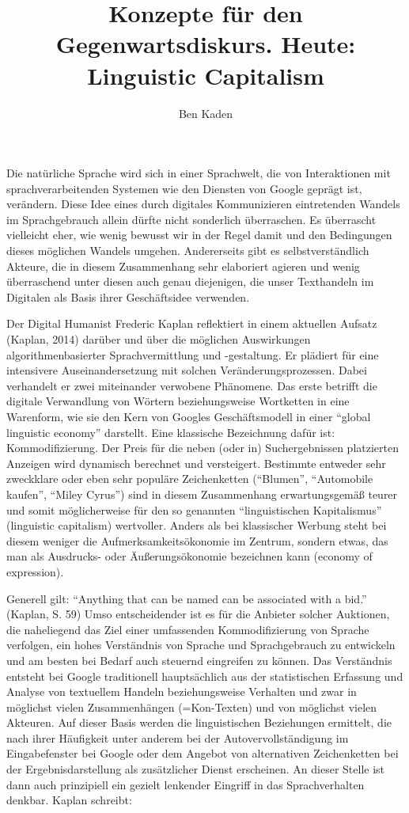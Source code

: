 \documentclass[a4paper,
fontsize=11pt,
oneside,
numbers=noperiodatend,
parskip=half-,
bibliography=totoc,
final
]{scrartcl}
\title{\LARGE{Konzepte für den Gegenwartsdiskurs. Heute: Linguistic Capitalism}} %
\author{Ben Kaden} %
\date{}
\begin{document}
\maketitle
\thispagestyle{fancyplain} 


Die natürliche Sprache wird sich in einer Sprachwelt, die von
Interaktionen mit sprachverarbeitenden Systemen wie den Diensten von
Google geprägt ist, verändern. Diese Idee eines durch digitales
Kommunizieren eintretenden Wandels im Sprachgebrauch allein dürfte nicht
sonderlich überraschen. Es überrascht vielleicht eher, wie wenig bewusst
wir in der Regel damit und den Bedingungen dieses möglichen Wandels
umgehen. Andererseits gibt es selbstverständlich Akteure, die in diesem
Zusammenhang sehr elaboriert agieren und wenig überraschend unter diesen
auch genau diejenigen, die unser Texthandeln im Digitalen als Basis
ihrer Geschäftsidee verwenden.

Der Digital Humanist Frederic Kaplan reflektiert in einem aktuellen
Aufsatz (Kaplan, 2014) darüber und über die möglichen Auswirkungen
algorithmenbasierter Sprachvermittlung und -gestaltung. Er plädiert für
eine intensivere Auseinandersetzung mit solchen Veränderungsprozessen.
Dabei verhandelt er zwei miteinander verwobene Phänomene. Das erste
betrifft die digitale Verwandlung von Wörtern beziehungsweise Wortketten
in eine Warenform, wie sie den Kern von Googles Geschäftsmodell in einer
\enquote{global linguistic economy} darstellt. Eine klassische
Bezeichnung dafür ist: Kommodifizierung. Der Preis für die neben (oder
in) Suchergebnissen platzierten Anzeigen wird dynamisch berechnet und
versteigert. Bestimmte entweder sehr zweckklare oder eben sehr populäre
Zeichenketten (\enquote{Blumen}, \enquote{Automobile kaufen},
\enquote{Miley Cyrus}) sind in diesem Zusammenhang erwartungsgemäß
teurer und somit möglicherweise für den so genannten
\enquote{linguistischen Kapitalismus} (linguistic capitalism)
wertvoller. Anders als bei klassischer Werbung steht bei diesem weniger
die Aufmerksamkeitsökonomie im Zentrum, sondern etwas, das man als
Ausdrucks- oder Äußerungsökonomie bezeichnen kann (economy of
expression).

Generell gilt: \enquote{Anything that can be named can be associated
with a bid.} (Kaplan, S. 59) Umso entscheidender ist es für die Anbieter
solcher Auktionen, die naheliegend das Ziel einer umfassenden
Kommodifizierung von Sprache verfolgen, ein hohes Verständnis von
Sprache und Sprachgebrauch zu entwickeln und am besten bei Bedarf auch
steuernd eingreifen zu können. Das Verständnis entsteht bei Google
traditionell hauptsächlich aus der statistischen Erfassung und Analyse
von textuellem Handeln beziehungsweise Verhalten und zwar in möglichst
vielen Zusammenhängen (=Kon-Texten) und von möglichst vielen Akteuren.
Auf dieser Basis werden die linguistischen Beziehungen ermittelt, die
nach ihrer Häufigkeit unter anderem bei der Autovervollständigung im
Eingabefenster bei Google oder dem Angebot von alternativen
Zeichenketten bei der Ergebnisdarstellung als zusätzlicher Dienst
erscheinen. An dieser Stelle ist dann auch prinzipiell ein gezielt
lenkender Eingriff in das Sprachverhalten denkbar. Kaplan schreibt:
\end{document}
